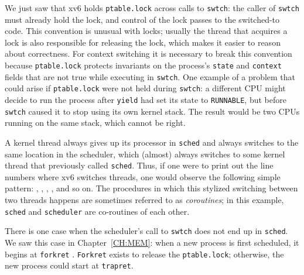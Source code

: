 We just saw that xv6 holds
\lstinline{ptable.lock}
across calls to
\lstinline{swtch}:
the caller of
\lstinline{swtch}
must already hold the lock, and control of the lock passes to the
switched-to code.  This convention is unusual with locks; usually
the thread that acquires a lock is also responsible for
releasing the lock, which makes it easier to reason about correctness.
For context switching it is necessary to break this convention because
\lstinline{ptable.lock}
protects invariants on the process's
\lstinline{state}
and
\lstinline{context}
fields that are not true while executing in
\lstinline{swtch}.
One example of a problem that could arise if
\lstinline{ptable.lock}
were not held during
\lstinline{swtch}:
a different CPU might decide
to run the process after 
\lstinline{yield}
had set its state to
\lstinline{RUNNABLE},
but before 
\lstinline{swtch}
caused it to stop using its own kernel stack.
The result would be two CPUs running on the same stack,
which cannot be right.

A kernel thread always gives up its
processor in
\lstinline{sched} 
and always switches to the same location in the scheduler, which
(almost) always switches to some kernel thread that previously called
\lstinline{sched}. 
Thus, if one were to print out the line numbers where xv6 switches
threads, one would observe the following simple pattern:
,
,
,
,
and so on.  The procedures in which this stylized switching between
two threads happens are sometimes referred to as 
\textit{coroutines}; 
in this example,
\lstinline{sched}
and
\lstinline{scheduler}
are co-routines of each other.

There is one case when the scheduler's call to
\lstinline{swtch}
does not end up in
\lstinline{sched}.
We saw this case in Chapter~\ref{CH:MEM}: when a
new process is first scheduled, it begins at
\lstinline{forkret}
.
\lstinline{Forkret}
exists to release the 
\lstinline{ptable.lock};
otherwise, the new process could start at
\lstinline{trapret}.

